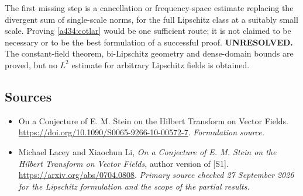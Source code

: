 \documentclass[11pt]{article}
\begin{document}
The first missing step is a cancellation or
frequency-space estimate replacing the divergent
sum of single-scale norms, for the full Lipschitz
class at a suitably small scale. Proving
\eqref{a434:cotlar} would be one sufficient route;
it is not claimed to be necessary or to be the
best formulation of a successful proof.
\textbf{UNRESOLVED.} The constant-field theorem,
bi-Lipschitz geometry and dense-domain bounds are
proved, but no $L^2$ estimate for arbitrary
Lipschitz fields is obtained.

\subsection{Sources}
\begin{itemize}
\item[S1]On a Conjecture of E. M. Stein on the Hilbert Transform on Vector Fields.
\url{https://doi.org/10.1090/S0065-9266-10-00572-7}.
\textit{Formulation source.}
\item[E1]Michael Lacey and Xiaochun Li, \emph{On a Conjecture of E. M. Stein on the Hilbert Transform on Vector Fields}, author version of [S1].
\url{https://arxiv.org/abs/0704.0808}.
\textit{Primary source checked 27 September 2026 for the Lipschitz formulation and the scope of the partial results.}
\end{itemize}
\end{document}
